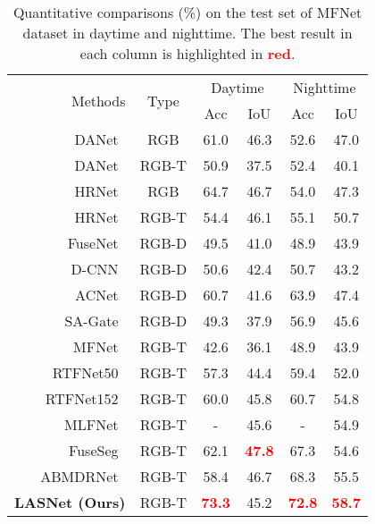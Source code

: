 \documentclass[journal]{IEEEtran}
\begin{document}
\begin{table}[t!]
  \centering
  \small
  \renewcommand{\arraystretch}{1.4}
  \renewcommand{\tabcolsep}{2.6mm}
  \caption{
    Quantitative comparisons (\%) on the test set of MFNet dataset in daytime and nighttime.
   The best result in each column is highlighted in \textcolor{red}{\textbf{red}}.
    }
\label{table:MFNet_DayNight}
  
\begin{tabular}{r|c|cccc}
\midrule[1pt]    
 \multirow{2}{*}{\normalsize{Methods}}& \multirow{2}{*}{\normalsize{Type}}
 & \multicolumn{2}{c}{Daytime} & \multicolumn{2}{c}{Nighttime} \\
 
 \cline{3-6} 
       & & Acc & IoU & Acc & IoU \\
	     
\midrule[1pt] DANet~\cite{2019DANet}   & RGB & 61.0 & 46.3 & 52.6 & 47.0  \\
DANet~\cite{2019DANet}   & RGB-T & 50.9 & 37.5 & 52.4 & 40.1  \\
\hline
HRNet~\cite{2019HRNet}   & RGB & 64.7 & 46.7 & 54.0 & 47.3  \\
HRNet~\cite{2019HRNet}   & RGB-T & 54.4 & 46.1 & 55.1 & 50.7  \\								   						
							   						
\hline FuseNet~\cite{2016FuseNet}   & RGB-D & 49.5 & 41.0 & 48.9 & 43.9  \\
D-CNN~\cite{2018D-CNN}     & RGB-D & 50.6 & 42.4 & 50.7 & 43.2  \\
ACNet~\cite{2019ACNet}     & RGB-D & 60.7 & 41.6 & 63.9 & 47.4  \\
SA-Gate~\cite{2020SA-Gate}   & RGB-D & 49.3 & 37.9 & 56.9 & 45.6  \\
							   						
\hline MFNet~\cite{2017MFNet}          & RGB-T & 42.6 & 36.1 & 48.9 & 43.9  \\
RTFNet50~\cite{2019RTFNet}    & RGB-T & 57.3 & 44.4 & 59.4 & 52.0  \\	
RTFNet152~\cite{2019RTFNet}  & RGB-T & 60.0 & 45.8 & 60.7 & 54.8  \\
MLFNet~\cite{2021MLFNet}   & RGB-T & - & 45.6 & - & 54.9  \\
	

FuseSeg~\cite{2021FuseSeg}  & RGB-T & 62.1 & \textcolor{red}{\textbf{47.8}} & 67.3 & 54.6  \\
ABMDRNet~\cite{2021ABMDRNet}    & RGB-T & 58.4 & 46.7 & 68.3 & 55.5 \\	
								   						

\hline
\hline
\textbf{LASNet (Ours)} & RGB-T & \textcolor{red}{\textbf{73.3}} & 45.2 & \textcolor{red}{\textbf{72.8}} & \textcolor{red}{\textbf{58.7}} \\	   
\toprule[1pt]
\end{tabular}
\end{table}
\end{document}
